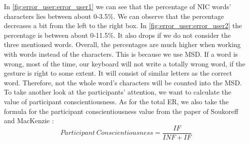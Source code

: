 In \cref{fig:error_user:error_user1} we can see that the percentage of NIC words' characters lies between about 0-3.5\%. We can observe that the percentage decreases a bit from the left to the right box. In \cref{fig:error_user:error_user2} the percentage is between about 0-11.5\%. It also drops if we do not consider the three mentioned words. Overall, the percentages are much higher when working with words instead of the characters. This is because we use MSD. If a word is wrong, most of the time, our keyboard will not write a totally wrong word, if the gesture is right to some extent. It will consist of similar letters as the correct word. Therefore, not the whole word's characters will be counted into the MSD.\\

To take another look at the participants' attention, we want to calculate the value of participant conscientiousness. As for the total ER, we also take the formula for the participant conscientiousness value from the paper of Soukoreff and MacKenzie \cite{10.1145/642611.642632}:
\begin{equation}
    Participant\ Conscientiousness = \frac{IF}{INF + IF}
    \label{eq:total_er}
\end{equation}


